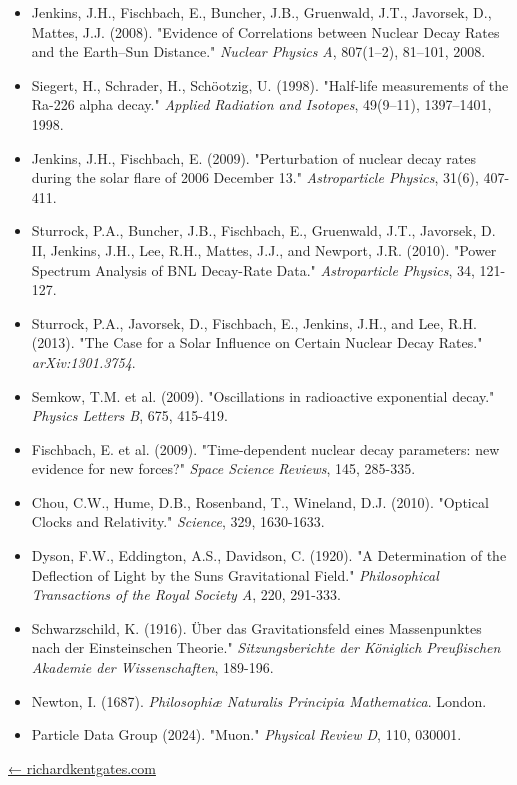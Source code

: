 \documentclass[
  10pt,
]{article}
\providecommand{\tightlist}{%
  \setlength{\itemsep}{0pt}\setlength{\parskip}{0pt}}
\begin{document}
\begin{itemize}
\tightlist
\item
  Jenkins, J.H., Fischbach, E., Buncher, J.B., Gruenwald, J.T.,
  Javorsek, D., Mattes, J.J. (2008). "Evidence of Correlations between
  Nuclear Decay Rates and the Earth--Sun Distance." \emph{Nuclear
  Physics A}, 807(1--2), 81--101, 2008.
\item
  Siegert, H., Schrader, H., Schöotzig, U. (1998). "Half-life
  measurements of the Ra-226 alpha decay." \emph{Applied Radiation and
  Isotopes}, 49(9--11), 1397--1401, 1998.
\item
  Jenkins, J.H., Fischbach, E. (2009). "Perturbation of nuclear decay
  rates during the solar flare of 2006 December 13." \emph{Astroparticle
  Physics}, 31(6), 407-411.
\item
  Sturrock, P.A., Buncher, J.B., Fischbach, E., Gruenwald, J.T.,
  Javorsek, D. II, Jenkins, J.H., Lee, R.H., Mattes, J.J., and Newport,
  J.R. (2010). "Power Spectrum Analysis of BNL Decay-Rate Data."
  \emph{Astroparticle Physics}, 34, 121-127.
\item
  Sturrock, P.A., Javorsek, D., Fischbach, E., Jenkins, J.H., and Lee,
  R.H. (2013). "The Case for a Solar Influence on Certain Nuclear Decay
  Rates." \emph{arXiv:1301.3754}.
\item
  Semkow, T.M. et al. (2009). "Oscillations in radioactive exponential
  decay." \emph{Physics Letters B}, 675, 415-419.
\item
  Fischbach, E. et al. (2009). "Time-dependent nuclear decay parameters:
  new evidence for new forces?" \emph{Space Science Reviews}, 145,
  285-335.
\item
  Chou, C.W., Hume, D.B., Rosenband, T., Wineland, D.J. (2010). "Optical
  Clocks and Relativity." \emph{Science}, 329, 1630-1633.
\item
  Dyson, F.W., Eddington, A.S., Davidson, C. (1920). "A Determination of
  the Deflection of Light by the Sun\textquotesingle s Gravitational
  Field." \emph{Philosophical Transactions of the Royal Society A}, 220,
  291-333.
\item
  Schwarzschild, K. (1916). Über das Gravitationsfeld eines
  Massenpunktes nach der Einsteinschen Theorie." \emph{Sitzungsberichte
  der Königlich Preußischen Akademie der Wissenschaften}, 189-196.
\item
  Newton, I. (1687). \emph{Philosophiæ Naturalis Principia Mathematica}.
  London.
\item
  Particle Data Group (2024). "Muon." \emph{Physical Review D}, 110,
  030001.
\end{itemize}

\href{https://richardkentgates.com/}{← richardkentgates.com}
\end{document}
